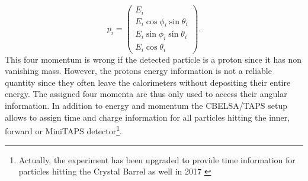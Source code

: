 \begin{equation}
		p_i=\begin{pmatrix}
		E_i\\E_i\cos\phi_i\sin\theta_i\\E_i\sin\phi_i\sin\theta_i\\E_i\cos\theta_i 
	\end{pmatrix}.
\end{equation}
This four momentum is wrong if the detected particle is a proton since it has non vanishing mass. However, the protons energy information is not a reliable quantity since they often leave the calorimeters without depositing their entire energy. The assigned four momenta are thus only used to access their angular information. In addition to energy and momentum the CBELSA/TAPS setup allows to assign time and charge information for all particles hitting the inner, forward or MiniTAPS detector\footnote{Actually, the experiment has been upgraded to provide time information for particles hitting the Crystal Barrel as well in 2017 \cite{urban}}. 
